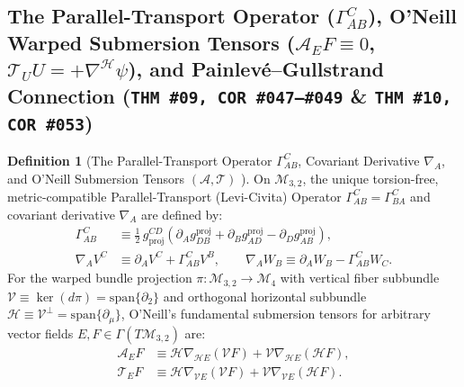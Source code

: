 \documentclass[11pt,a4paper]{article}
\newcommand{\catD}{\text{\textbf{\textcolor{blue!75!black}{[D]}}}}
\theoremstyle{definition}
\newtheorem{definition}[axiom]{Definition}
\theoremstyle{plain}
\theoremstyle{remark}
\begin{document}
\subsection{\texorpdfstring{The Parallel-Transport Operator ($\Gamma^C_{AB}$), O'Neill Warped Submersion Tensors ($\mathcal{A}_E F \equiv 0$, $\mathcal{T}_U U = +\nabla^{\mathcal{H}}\psi$), and Painlev\'e--Gullstrand Connection (\texttt{THM~\#09, COR~\#047--\#049} \& \texttt{THM~\#10, COR~\#053})}{The Parallel-Transport Operator, O'Neill Warped Submersion Tensors, and Painleve-Gullstrand Connection}}

\begin{definition}[The Parallel-Transport Operator $\Gamma^C_{AB}$, Covariant Derivative $\nabla_A$, and O'Neill Submersion Tensors $(\mathcal{A}, \mathcal{T})$ \catD]\label{def:c2_parallel_transport}
On $\mathcal{M}_{3,2}$, the unique torsion-free, metric-compatible Parallel-Transport (Levi-Civita) Operator $\Gamma^C_{AB} = \Gamma^C_{BA}$ and covariant derivative $\nabla_A$ are defined by:
\begin{align}
\Gamma^C_{AB} &\equiv \frac{1}{2}\,g^{CD}_{\mathrm{proj}}\!\left(\partial_A g_{DB}^{\mathrm{proj}} + \partial_B g_{AD}^{\mathrm{proj}} - \partial_D g_{AB}^{\mathrm{proj}}\right), \nonumber \\[3pt]
\nabla_A V^C &\equiv \partial_A V^C + \Gamma^C_{AB}V^B, \qquad
\nabla_A W_B \equiv \partial_A W_B - \Gamma^C_{AB}W_C. \label{eq:c2_christoffel_def}
\end{align}
For the warped bundle projection $\pi: \mathcal{M}_{3,2} \to \mathcal{M}_4$ with vertical fiber subbundle $\mathcal{V} \equiv \ker(d\pi) = \mathrm{span}\{\partial_2\}$ and orthogonal horizontal subbundle $\mathcal{H} \equiv \mathcal{V}^\perp = \mathrm{span}\{\partial_\mu\}$, O'Neill's fundamental submersion tensors \cite{ONeill1983} for arbitrary vector fields $E, F \in \Gamma(T\mathcal{M}_{3,2})$ are:
\begin{align}
\mathcal{A}_E F &\equiv \mathcal{H}\nabla_{\mathcal{H}E}\left(\mathcal{V}F\right) + \mathcal{V}\nabla_{\mathcal{H}E}\left(\mathcal{H}F\right), \nonumber \\[3pt]
\mathcal{T}_E F &\equiv \mathcal{H}\nabla_{\mathcal{V}E}\left(\mathcal{V}F\right) + \mathcal{V}\nabla_{\mathcal{V}E}\left(\mathcal{H}F\right). \label{eq:c2_oneill_tensors_def}
\end{align}
\end{definition}
\end{document}
